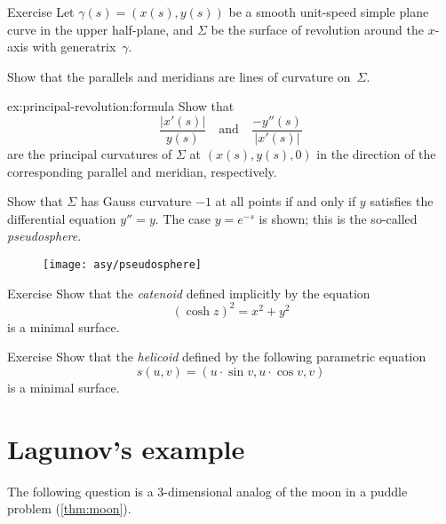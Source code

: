 \begin{thm}{Exercise}\label{ex:principal-revolution}
Let $\gamma(s)=(x(s),y(s))$ be a smooth unit-speed simple plane curve in the upper half-plane,
and $\Sigma$ be the surface of revolution around the $x$-axis with generatrix~$\gamma$.

\begin{subthm}{}
Show that the parallels and meridians are lines of curvature on~$\Sigma$.
\end{subthm}

\begin{subthm}{ex:principal-revolution:formula}
Show that 
\[\frac{|x'(s)|}{y(s)}
\quad
\text{and}
\quad
\frac{-y''(s)}{|x'(s)|}
\]
are the principal curvatures of $\Sigma$ at $(x(s),y(s),0)$ in the direction of the corresponding parallel and meridian, respectively.
\end{subthm}

\begin{subthm}{}
Show that $\Sigma$ has Gauss curvature $-1$ at all points if and only if $y$ satisfies the differential equation $y''=y$. 
The case $y=e^{-s}$ is shown; this is the so-called \emph{pseudosphere}.
\end{subthm}

\end{thm}

\begin{figure}[h!]
\vskip-3mm
\hskip30mm
\texttt{[image: asy/pseudosphere]}
\vskip-3mm
\end{figure}

\begin{thm}{Exercise}\label{ex:catenoid-is-minimal}
Show that the \emph{catenoid} defined implicitly by the equation
\[(\cosh z)^2=x^2+y^2\]
is a minimal surface.
\end{thm}

\begin{thm}{Exercise}\label{ex:helicoid-is-minimal}
Show that the \emph{helicoid} defined by the following parametric equation
\[s(u,v)=(u\cdot \sin v,u\cdot \cos v,v)\]
is a minimal surface.
\end{thm}

\section{Lagunov's example}

The following question is a 3-dimensional analog of the moon in a puddle problem (\ref{thm:moon}).

